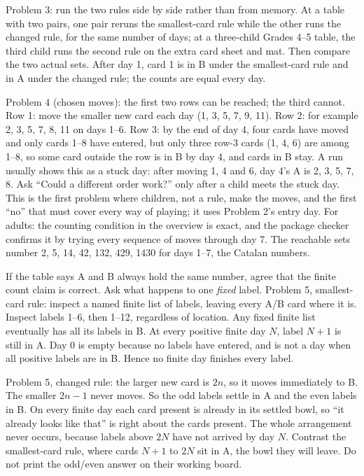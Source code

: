 \documentclass[11pt,letterpaper]{article}
\begin{document}
Problem 3: run the two rules side by side rather than from memory. At a table with two pairs, one pair reruns the smallest-card rule while the other runs the changed rule, for the same number of days; at a three-child Grades 4--5 table, the third child runs the second rule on the extra card sheet and mat. Then compare the two actual sets. After day 1, card 1 is in B under the smallest-card rule and in A under the changed rule; the counts are equal every day.

Problem 4 (chosen moves): the first two rows can be reached; the third cannot. Row 1: move the smaller new card each day (1, 3, 5, 7, 9, 11). Row 2: for example 2, 3, 5, 7, 8, 11 on days 1--6. Row 3: by the end of day 4, four cards have moved and only cards 1--8 have entered, but only three row-3 cards (1, 4, 6) are among 1--8, so some card outside the row is in B by day 4, and cards in B stay. A run usually shows this as a stuck day: after moving 1, 4 and 6, day 4's A is 2, 3, 5, 7, 8. Ask ``Could a different order work?'' only after a child meets the stuck day. This is the first problem where children, not a rule, make the moves, and the first ``no'' that must cover every way of playing; it uses Problem 2's entry day. For adults: the counting condition in the overview is exact, and the package checker confirms it by trying every sequence of moves through day 7. The reachable sets number 2, 5, 14, 42, 132, 429, 1430 for days 1--7, the Catalan numbers.

If the table says A and B always hold the same number, agree that the finite count claim is correct. Ask what happens to one \emph{fixed} label. Problem 5, smallest-card rule: inspect a named finite list of labels, leaving every A/B card where it is. Inspect labels 1--6, then 1--12, regardless of location. Any fixed finite list eventually has all its labels in B. At every positive finite day $N$, label $N+1$ is still in A. Day 0 is empty because no labels have entered, and is not a day when all positive labels are in B. Hence no finite day finishes every label.

Problem 5, changed rule: the larger new card is $2n$, so it moves immediately to B. The smaller $2n-1$ never moves. So the odd labels settle in A and the even labels in B. On every finite day each card present is already in its settled bowl, so ``it already looks like that'' is right about the cards present. The whole arrangement never occurs, because labels above $2N$ have not arrived by day $N$. Contrast the smallest-card rule, where cards $N+1$ to $2N$ sit in A, the bowl they will leave. Do not print the odd/even answer on their working board.
\newpage
\end{document}
